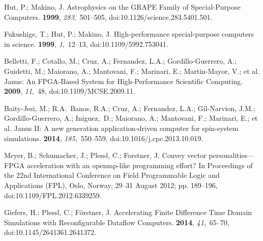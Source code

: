 \documentclass[computation,article,accept,moreauthors,pdftex]{Definitions/mdpi}
\begin{document}
\begin{thebibliography}{999}
Hut, P.; Makino, J.
\newblock Astrophysics on the GRAPE Family of Special-Purpose Computers.
 {\bf 1999}, {\em 283},~501--505, doi:10.1126/science.283.5401.501.

Fukushige, T.; Hut, P.; Makino, J.
\newblock High-performance special-purpose computers in science.
 {\bf 1999}, {\em 1},~12--13, doi:10.1109/5992.753041.

Belletti, F.; Cotallo, M.; Cruz, A.; Fernandez, L.A.; Gordillo-Guerrero, A.;
 Guidetti, M.; Maiorano, A.; Mantovani, F.; Marinari, E.; Martin-Mayor, V.;
 et al.
\newblock Janus: An FPGA-Based System for High-Performance Scientific
 Computing.
 {\bf 2009}, {\em 11},~48, doi:10.1109/MCSE.2009.11.

Baity-Jesi, M.; R.A.~Banos, R.A.; Cruz, A.; Fernandez, L.A.; Gil-Narvion, J.M.;
 Gordillo-Guerrero, A.; Iniguez,~D.; Maiorano, A.; Mantovani, F.; Marinari,
 E.; et al.
\newblock Janus II: A new generation application-driven computer for
 spin-system simulations.
 {\bf 2014}, {\em 185},~550--559, doi:10.1016/j.cpc.2013.10.019.

Meyer, B.; Schumacher, J.; Plessl, C.; Forstner, J.
\newblock Convey vector personalities---FPGA acceleration with an openmp-like
 programming effort?
\newblock In Proceedings of the 22nd International Conference on Field Programmable Logic and Applications (FPL), Oslo, Norway, 29--31 August 2012;
 pp. 189--196, doi:10.1109/FPL.2012.6339259.

Giefers, H.; Plessl, C.; F\"{o}rstner, J.
\newblock Accelerating Finite Difference Time Domain Simulations with
 Reconfigurable Dataflow Computers.
 {\bf 2014}, {\em 41},~65--70, doi:10.1145/2641361.2641372.


\end{thebibliography}
\end{document}
